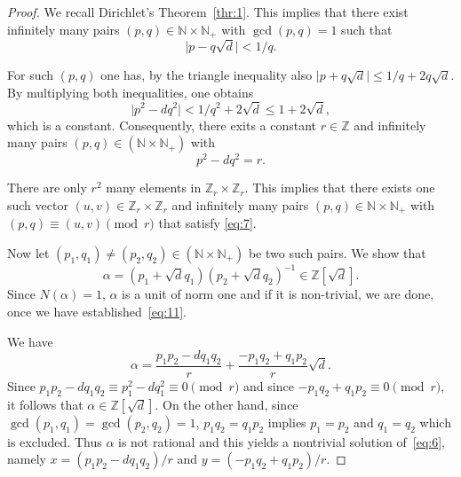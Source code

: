 \documentclass[a4paper,11pt,american]{article}
\newcommand{\N}{\mathbb{N}}
\newcommand{\Z}{\mathbb{Z}}
\theoremstyle{plain}
\theoremstyle{definition}
\begin{document}
\begin{proof}
  We recall Dirichlet's Theorem~\ref{thr:1}. This implies that there exist infinitely many pairs $(p,q) \in\N\times\N_+$ with $\gcd(p,q) = 1$ such that 
   \begin{displaymath}
    \vert p - q \sqrt{d}  \vert < 1/q. 
  \end{displaymath}

  For such $(p,q)$ one has, by the triangle inequality also  $ \vert p +  q \sqrt{d}  \vert \leq 1/q + 2 q \sqrt{d} $. By multiplying both inequalities, one obtains
  \begin{displaymath}
    \vert p^2 - d q^2 \vert <  1/q^2 + 2 \sqrt{d} \leq 1 + 2 \sqrt{d},
  \end{displaymath}
  which is a constant. Consequently, there exits a constant $r \in\Z$
  and infinitely many pairs $(p,q) \in(\N\times\N_+)$ with
  \begin{equation}
    \label{eq:7}    
    p^2 - d q^2  = r.
  \end{equation}

  There are only $r^2$ many elements in $\Z_r \times\Z_r$. This implies that
  there exists one such vector $(u,v) \in \Z_r \times\Z_r$ and infinitely many
  pairs $(p,q) \in\N\times\N_+$ with $(p,q) \equiv (u,v) \pmod{r}$ that satisfy
  \eqref{eq:7}.


  Now let   $(p_1,q_1) \neq  (p_2,q_2) \in(\N \times \N_+)$ be two such pairs. We show that
  \begin{equation}
    \label{eq:11}   
  \alpha =  (p_1 + \sqrt{d} q_1 ) (p_2 + \sqrt{d} q_2)^{-1} \in \Z[\sqrt{d}]. 
  \end{equation}
  Since $N(\alpha) = 1$, $\alpha$ is a unit of norm one and if it is non-trivial, we are done, once we have established~\eqref{eq:11}.

  We have
  \begin{displaymath}
    \alpha = \frac{p_1 p_2 - d q_1 q_2}{r} + \frac{-p_1q_2 + q_1p_2}{r} \sqrt{d}.  
  \end{displaymath} 
  Since $p_1 p_2 - d q_1 q_2 \equiv p_1^2 - d q_1^2 \equiv 0\pmod{r}$ and since $-p_1q_2 + q_1p_2 \equiv 0 \pmod{r}$, it follows that $\alpha \in\Z[\sqrt{d}]$.  On the other hand, since $\gcd(p_1,q_1) =\gcd(p_2,q_2)=1$,   $p_1q_2 = q_1p_2$ implies $p_1 = p_2$ and $q_1 = q_2$ which is excluded. Thus $\alpha$ is not rational and this yields a nontrivial solution of~\eqref{eq:6}, namely $x = (p_1 p_2 - d q_1 q_2)/r$ and $y = (-p_1q_2 + q_1p_2)/{r}$. 
\end{proof}
\end{document}
